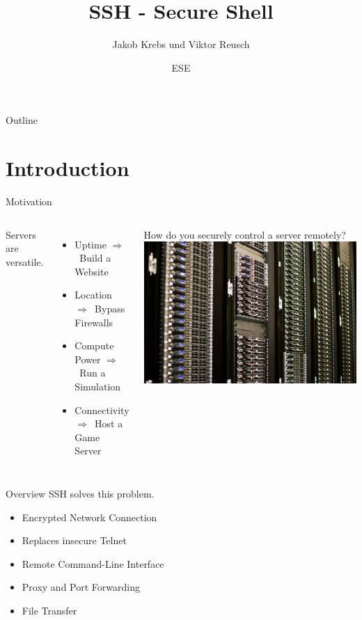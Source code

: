 \documentclass[10pt,graphics,aspectratio=169,table]{beamer}
\title{SSH - Secure Shell}
\author{Jakob Krebs und Viktor Reusch}
\date{ESE \the\year{}}
\institute{NERD101 - ESE - ifsr - TU Dresden}
\newcommand{\ra}{$\Rightarrow$\ }
\begin{document}
\maketitle
\begin{frame}{Outline}
	\tableofcontents
\end{frame}

\section{Introduction}
\begin{frame}{Motivation}
\begin{columns}
	Servers are versatile.
	\begin{itemize}
		\item Uptime \ra Build a Website
		\item Location \ra Bypass Firewalls
		\item Compute Power \ra Run a Simulation
		\item Connectivity \ra Host a Game Server
	\end{itemize}
	How do you securely control a server remotely?
	\includegraphics[width=\textwidth]{img/servers.jpg} \cite{servers}
\end{columns}
\end{frame}

\begin{frame}{Overview}
	SSH solves this problem.
	\begin{itemize}
		\item Encrypted Network Connection
		\item Replaces insecure Telnet
		\item Remote Command-Line Interface
		\item Proxy and Port Forwarding
		\item File Transfer
	\end{itemize}
\end{frame}
\end{document}
